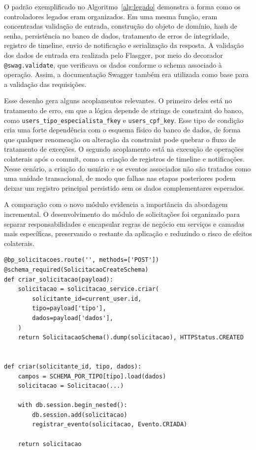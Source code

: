 O padrão exemplificado no Algoritmo~\ref{alg:legado} demonstra a forma como os controladores legados eram organizados. Em uma mesma função, eram concentradas validação de entrada, construção do objeto de domínio, hash de senha, persistência no banco de dados, tratamento de erros de integridade, registro de timeline, envio de notificação e serialização da resposta. A validação dos dados de entrada era realizada pelo Flasgger, por meio do decorador \texttt{@swag.validate}, que verificava os dados conforme o schema associado à operação. Assim, a documentação Swagger também era utilizada como base para a validação das requisições.

Esse desenho gera alguns acoplamentos relevantes. O primeiro deles está no tratamento de erro, em que a lógica depende de strings de constraint do banco, como \allowbreak\mbox{\texttt{users\_tipo\_especialista\_fkey}} e \texttt{users\_cpf\_key}. Esse tipo de condição cria uma forte dependência com o esquema físico do banco de dados, de forma que qualquer renomeação ou alteração da constraint pode quebrar o fluxo de tratamento de exceções. O segundo acoplamento está na execução de operações colaterais após o commit, como a criação de registros de timeline e notificações. Nesse cenário, a criação do usuário e os eventos associados não são tratados como uma unidade transacional, de modo que falhas nas etapas posteriores podem deixar um registro principal persistido sem os dados complementares esperados.

A comparação com o novo módulo evidencia a importância da abordagem incremental. O desenvolvimento do módulo de solicitações foi organizado para separar responsabilidades e encapsular regras de negócio em serviços e camadas mais específicas, preservando o restante da aplicação e reduzindo o risco de efeitos colaterais.

\begin{algorithm}[htbp]
\caption{Estrutura do novo módulo, com separação de responsabilidades.}
\label{alg:novo}
\begin{verbatim}
@bp_solicitacoes.route('', methods=['POST'])
@schema_required(SolicitacaoCreateSchema)
def criar_solicitacao(payload):
    solicitacao = solicitacao_service.criar(
        solicitante_id=current_user.id,
        tipo=payload['tipo'],
        dados=payload['dados'],
    )
    return SolicitacaoSchema().dump(solicitacao), HTTPStatus.CREATED


def criar(solicitante_id, tipo, dados):
    campos = SCHEMA_POR_TIPO[tipo].load(dados)
    solicitacao = Solicitacao(...)

    with db.session.begin_nested():
        db.session.add(solicitacao)
        registrar_evento(solicitacao, Evento.CRIADA)

    return solicitacao
\end{verbatim}
\end{algorithm}

